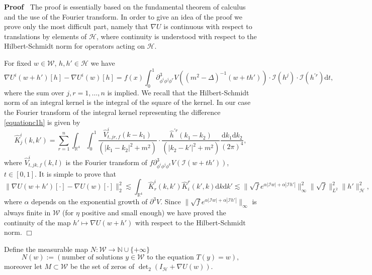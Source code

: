 \documentclass[a4paper,10pt]{article}
\newcommand{\assign}{:=}
\newcommand{\mathd}{\mathrm{d}}
\newenvironment{proof}{\noindent\textbf{Proof\ }}{\hspace*{\fill}$\Box$\medskip}
\begin{document}
\begin{proof}
  The proof is essentially based on the fundamental theorem of calculus and
  the use of the Fourier transform. In order to give an idea of the proof we
  prove only the most difficult part, namely that $\nabla U$ is continuous
  with respect to translations by elements of $\mathcal{H}$, where continuity
  is understood with respect to the Hilbert-Schmidt norm for operators acting
  on $\mathcal{H}$.
  
  For fixed $w \in \mathcal{W}$, $h, h' \in \mathcal{H}$ we have
  \begin{equation}
    \nabla U^i (w + h') [h] - \nabla U^i (w) [h] = f (x) \int_0^1
    \partial_{\phi^i \phi^j \phi^r}^3 V ((m^2 - \Delta)^{- 1} (w + t h'))
    \cdot \mathcal{I} (h^j) \cdot \mathcal{I} (h^{\prime r}) \mathd t
    \label{equationc1h},
  \end{equation}
  where the sum over $j, r = 1, \ldots, n$ is implied. We recall that the
  Hilbert-Schmidt norm of an integral kernel is the integral of the square of
  the kernel. In our case the Fourier transform of the integral kernel
  representing the difference {\eqref{equationc1h}} is given by
  \[ \hat{K}^i_j (k, k') = \sum_{r = 1}^n \int_{\mathbb{R}^4} \int^1_0
     \frac{\hat{V}_{t, j r, f}^i (k - k_1)}{(| k_1 - k_2 |^2 + m^2)} \cdot
     \frac{\hat{h}^{\prime r} (k_1 - k_2)}{(| k_2 - k' |^2 + m^2)}
     \frac{\mathd k_1 \mathd k_2}{(2 \pi)^4}, \]
  where $\hat{V}_{t, j k, f}^i (k, l)$ is the Fourier transform of $f
  \partial_{\phi^i \phi^j \phi^k}^3 V (\mathcal{I} (w + t h'))$, $t \in [0,
  1]$. It is simple to prove that
  \[ \| \nabla U (w + h') [\cdot] - \nabla U (w) [\cdot] \|_2^2 \lesssim
     \int_{\mathbb{R}^4} \hat{K}^i_r (k, k') \hat{K}^r_i (k', k) \mathd k
     \mathd k' \lesssim \| \sqrt{f} e^{\alpha | \mathcal{I}w | + \alpha |
     \mathcal{I}h' |} \|^2_{\infty} \| \sqrt{f} \|^2_{L^2} \|h'
     \|^2_{\mathcal{H}}, \]
  where $\alpha$ depends on the exponential growth of $\partial^3 V$. Since
  $\| \sqrt{f} e^{\alpha | \mathcal{I}w | + \alpha | \mathcal{I}h' |}
  \|_{\infty}$ is always finite in $\mathcal{W}$ (for $\eta$ positive and
  small enough) we have proved the continuity of the map $h' \longmapsto
  \nabla U (w + h')$ with respect to the Hilbert-Schmidt norm.
\end{proof}

Define the measurable map $N : \mathcal{W} \rightarrow \mathbb{N} \cup \{ +
\infty \}$
\[ N (w) \assign \left( \text{number of solutions $y \in \mathcal{W}$ to the
   equation $T (y) = w$} \right), \]
moreover let $M \subset \mathcal{W}$ be the set of zeros of $\det\nolimits_2
(I_{\mathcal{H}} + \nabla U (w))$.
\end{document}
